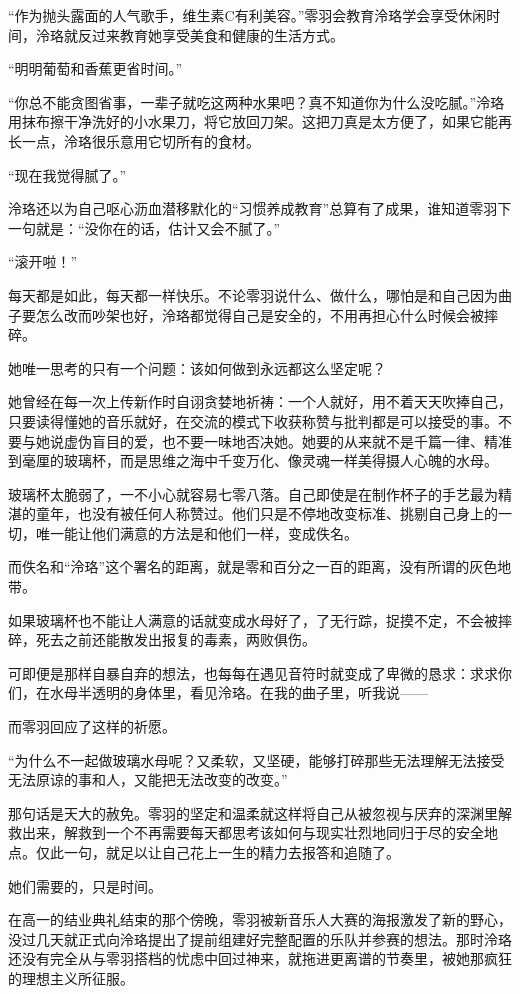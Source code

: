 \documentclass[UTF8, scheme = chinese, openany]{ctexbook}
\begin{document}
“作为抛头露面的人气歌手，维生素C有利美容。”零羽会教育泠珞学会享受休闲时间，泠珞就反过来教育她享受美食和健康的生活方式。

“明明葡萄和香蕉更省时间。”

“你总不能贪图省事，一辈子就吃这两种水果吧？真不知道你为什么没吃腻。”泠珞用抹布擦干净洗好的小水果刀，将它放回刀架。这把刀真是太方便了，如果它能再长一点，泠珞很乐意用它切所有的食材。

“现在我觉得腻了。”

泠珞还以为自己呕心沥血潜移默化的“习惯养成教育”总算有了成果，谁知道零羽下一句就是：“没你在的话，估计又会不腻了。”

“滚开啦！”

每天都是如此，每天都一样快乐。不论零羽说什么、做什么，哪怕是和自己因为曲子要怎么改而吵架也好，泠珞都觉得自己是安全的，不用再担心什么时候会被摔碎。

她唯一思考的只有一个问题：该如何做到永远都这么坚定呢？

她曾经在每一次上传新作时自诩贪婪地祈祷：一个人就好，用不着天天吹捧自己，只要读得懂她的音乐就好，在交流的模式下收获称赞与批判都是可以接受的事。不要与她说虚伪盲目的爱，也不要一味地否决她。她要的从来就不是千篇一律、精准到毫厘的玻璃杯，而是思维之海中千变万化、像灵魂一样美得摄人心魄的水母。

玻璃杯太脆弱了，一不小心就容易七零八落。自己即使是在制作杯子的手艺最为精湛的童年，也没有被任何人称赞过。他们只是不停地改变标准、挑剔自己身上的一切，唯一能让他们满意的方法是和他们一样，变成佚名。

而佚名和“泠珞”这个署名的距离，就是零和百分之一百的距离，没有所谓的灰色地带。

如果玻璃杯也不能让人满意的话就变成水母好了，了无行踪，捉摸不定，不会被摔碎，死去之前还能散发出报复的毒素，两败俱伤。

可即便是那样自暴自弃的想法，也每每在遇见音符时就变成了卑微的恳求：求求你们，在水母半透明的身体里，看见泠珞。在我的曲子里，听我说——

而零羽回应了这样的祈愿。

“为什么不一起做玻璃水母呢？又柔软，又坚硬，能够打碎那些无法理解无法接受无法原谅的事和人，又能把无法改变的改变。”

那句话是天大的赦免。零羽的坚定和温柔就这样将自己从被忽视与厌弃的深渊里解救出来，解救到一个不再需要每天都思考该如何与现实壮烈地同归于尽的安全地点。仅此一句，就足以让自己花上一生的精力去报答和追随了。

她们需要的，只是时间。

在高一的结业典礼结束的那个傍晚，零羽被新音乐人大赛的海报激发了新的野心，没过几天就正式向泠珞提出了提前组建好完整配置的乐队并参赛的想法。那时泠珞还没有完全从与零羽搭档的忧虑中回过神来，就拖进更离谱的节奏里，被她那疯狂的理想主义所征服。
\end{document}
